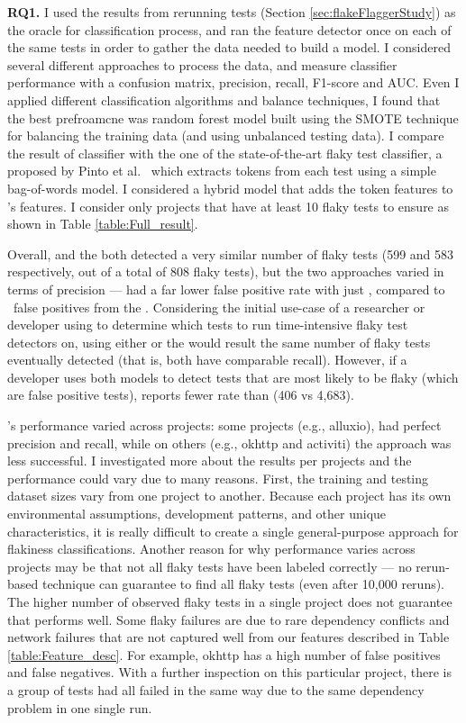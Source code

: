 \textbf{RQ1.} I used the results from rerunning tests (Section \ref{sec:flakeFlaggerStudy}) as the oracle for \sysName classification process, and ran the feature detector once on each of the same tests in order to gather the data needed to build a model.
I considered several different approaches to process the data, and measure classifier performance with a confusion matrix, precision, recall, F1-score and AUC. Even I applied different classification algorithms and balance techniques, I found that the best prefroamcne was  random forest model built using the SMOTE technique for balancing the training data (and using unbalanced testing data). I compare the result of \sysName classifier with the one of the state-of-the-art flaky test classifier, a \vocabName proposed by Pinto et al.~\cite{pinto2020vocabulary} which extracts tokens from each test using a simple bag-of-words model. I considered a hybrid model that adds the token features to \sysName's features. I consider only projects that have at least 10 flaky tests to ensure as shown in Table \ref{table:Full_result}. 

Overall, \sysName and the \vocabName  both detected a very similar number of flaky tests (599 and 583 respectively, out of a total of 808 flaky tests), but the two approaches varied in terms of precision --- \sysName had a far lower false positive rate with just \flaggerfp, compared to \msrfp~false positives from the \vocabName. Considering the initial use-case of a researcher or developer using \sysName to determine which tests to run time-intensive flaky test detectors on, using either \sysName or the \vocabName would result the same number of flaky tests eventually detected (that is, both have comparable recall).
However, if a developer uses both models to detect tests that are most likely to be flaky (which are false positive tests), \sysName reports fewer rate than \vocabName (406 vs 4,683).

\sysName's performance varied across projects: some projects (e.g., alluxio), had perfect precision and recall, while on others (e.g., okhttp and activiti) the approach was less successful. I investigated more about the results per projects and the performance could vary due to many reasons. First, the training and testing dataset sizes vary from one project to another. Because each project has its own environmental assumptions, development patterns, and other unique characteristics, it is really difficult to create a single general-purpose approach for flakiness classifications. Another reason for why performance varies across projects may be that not all flaky tests have been labeled correctly --- no rerun-based technique can guarantee to find all flaky tests (even after 10,000 reruns). The higher number of observed flaky tests in a single project does not guarantee that \sysName performs well.
Some flaky failures are due to rare dependency conflicts and network failures that are not captured well from our features described in Table \ref{table:Feature_desc}.
For example, okhttp has a high number of false positives and false negatives. With a further inspection on this particular project, there is a group of tests had all failed in the same way due to the same dependency problem in one single run.



